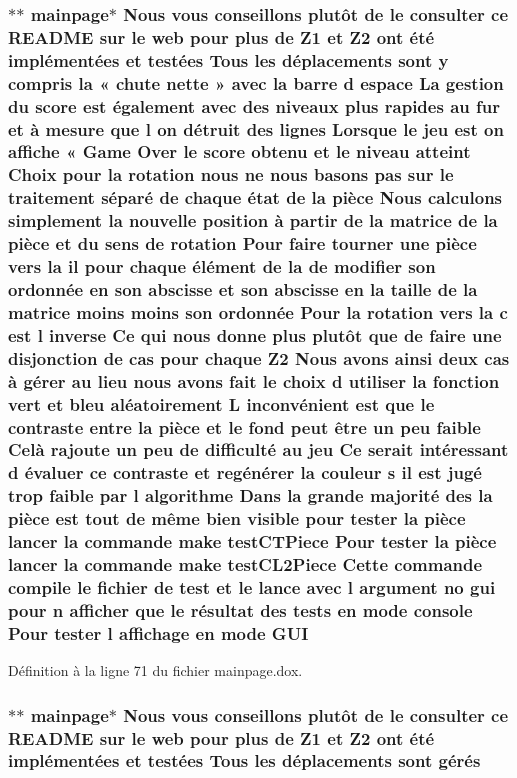 \hypertarget{mainpage_8dox_ae5213d53c1da87c36d69f8d2acaca332}{
\subsubsection[{G\-U\-I}]{\setlength{\rightskip}{0pt plus 5cm}$\ast$$\ast$ mainpage$\ast$ Nous vous conseillons plutô{\bf t} {\bf de} le consulter ce R\-E\-A\-D\-M\-E sur le web pour plus {\bf de} {\bf Z1} et Z2 ont é{\bf t}é implémentées et testées Tous les déplacements sont {\bf y} compris la « chute nette » avec la barre d espace La gestion du score est également avec des niveaux plus rapides au fur et à mesure que l on détruit des lignes Lorsque le jeu est on affiche « Game Over le score obtenu et le niveau atteint Choix pour la rotation nous ne nous basons pas sur le traitement {\bf s}éparé {\bf de} chaque état {\bf de} la pièce Nous calculons simplement la nouvelle position à partir {\bf de} la {\bf matrice} {\bf de} la pièce et du {\bf sens} {\bf de} rotation Pour faire tourner une pièce vers la il pour chaque élément {\bf de} la {\bf de} modifier son ordonnée en son abscisse et son abscisse en la taille {\bf de} la {\bf matrice} moins moins son ordonnée Pour la rotation vers la {\bf c} est l inverse Ce qui nous donne plus plutô{\bf t} que {\bf de} faire une disjonction {\bf de} {\bf cas} pour chaque Z2 Nous avons ainsi deux {\bf cas} à {\bf g}érer au lieu nous avons fait le choix d utiliser la fonction vert et bleu aléatoirement L inconvénient est que le contraste entre la pièce et le fond peut être un peu faible Celà rajoute un peu {\bf de} difficulté au jeu Ce serait intéressant d évaluer ce contraste et regé{\bf n}érer la couleur {\bf s} il est jugé trop faible par l algorithme Dans la grande majorité des la pièce est tout {\bf de} {\bf m}ême bien visible pour tester la pièce lancer la commande make test\-C\-T\-Piece Pour tester la pièce lancer la commande make test\-C\-L2\-Piece Cette commande compile le fichier {\bf de} test et le lance avec l argument no gui pour {\bf n} afficher que le {\bf r}ésultat des tests en {\bf mode} {\bf console} Pour tester l affichage en {\bf mode} G\-U\-I}}\label{mainpage_8dox_ae5213d53c1da87c36d69f8d2acaca332}


Définition à la ligne 71 du fichier mainpage.\-dox.

\hypertarget{mainpage_8dox_a3664b5d6af24a2026d7be1496a27268e}{
\subsubsection[{gérés}]{\setlength{\rightskip}{0pt plus 5cm}$\ast$$\ast$ mainpage$\ast$ Nous vous conseillons plutô{\bf t} {\bf de} le consulter ce R\-E\-A\-D\-M\-E sur le web pour plus {\bf de} {\bf Z1} et Z2 ont é{\bf t}é implémentées et testées Tous les déplacements sont {\bf g}é{\bf r}é{\bf s}}}\label{mainpage_8dox_a3664b5d6af24a2026d7be1496a27268e}


